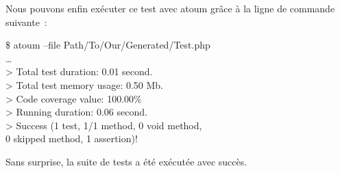 \noindent Nous pouvons enfin exécuter ce test avec atoum grâce à la ligne de
commande suivante~:
%
\begin{pre}
\$ atoum --file Path/To/Our/Generated/Test.php \\
… \\
> Total test duration: 0.01 second. \\
> Total test memory usage: 0.50 Mb. \\
> Code coverage value: 100.00\% \\
> Running duration: 0.06 second. \\
> Success (1 test, 1/1 method, 0 void method, \\
           0 skipped method, 1 assertion)!
\end{pre}
%
Sans surprise, la suite de tests a été exécutée avec succès.
